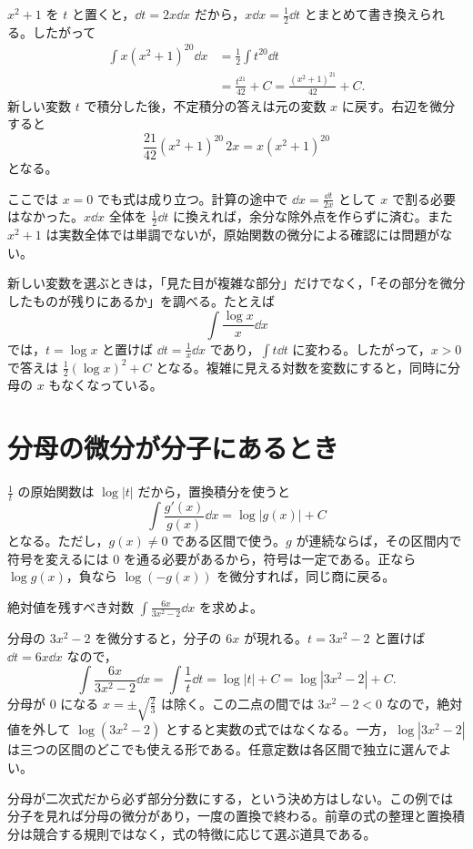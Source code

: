 $x^2+1$ を $t$ と置くと，$\dd t=2x\dd x$ だから，$x\dd x=\frac12\dd t$ とまとめて書き換えられる。したがって
\[
\begin{aligned}
 \int x(x^2+1)^{20}\dd x
 &=\frac12\int t^{20}\dd t\\
 &=\frac{t^{21}}{42}+C
 =\frac{(x^2+1)^{21}}{42}+C.
\end{aligned}
\]
新しい変数 $t$ で積分した後，不定積分の答えは元の変数 $x$ に戻す。右辺を微分すると
\[
 \frac{21}{42}(x^2+1)^{20}\,2x
 =x(x^2+1)^{20}
\]
となる。

ここでは $x=0$ でも式は成り立つ。計算の途中で $\dd x=\frac{\dd t}{2x}$ として $x$ で割る必要はなかった。$x\dd x$ 全体を $\frac12\dd t$ に換えれば，余分な除外点を作らずに済む。また $x^2+1$ は実数全体では単調でないが，原始関数の微分による確認には問題がない。

新しい変数を選ぶときは，「見た目が複雑な部分」だけでなく，「その部分を微分したものが残りにあるか」を調べる。たとえば
\[
 \int\frac{\log x}{x}\dd x
\]
では，$t=\log x$ と置けば $\dd t=\frac1x\dd x$ であり，$\int t\dd t$ に変わる。したがって，$x>0$ で答えは $\frac12(\log x)^2+C$ となる。複雑に見える対数を変数にすると，同時に分母の $x$ もなくなっている。

\section{分母の微分が分子にあるとき}\label{節:対数型の置換}

$\frac1t$ の原始関数は $\log|t|$ だから，置換積分を使うと
\[
 \int\frac{g'(x)}{g(x)}\dd x=\log|g(x)|+C
\]
となる。ただし，$g(x)\ne0$ である区間で使う。$g$ が連続ならば，その区間内で符号を変えるには $0$ を通る必要があるから，符号は一定である。正なら $\log g(x)$，負なら $\log(-g(x))$ を微分すれば，同じ商に戻る。

\begin{example}{絶対値を残すべき対数}
$\int\frac{6x}{3x^2-2}\dd x$ を求めよ。
\end{example}

分母の $3x^2-2$ を微分すると，分子の $6x$ が現れる。$t=3x^2-2$ と置けば $\dd t=6x\dd x$ なので，
\[
 \int\frac{6x}{3x^2-2}\dd x
 =\int\frac1t\dd t
 =\log|t|+C
 =\log|3x^2-2|+C.
\]
分母が $0$ になる $x=\pm\sqrt{\frac23}$ は除く。この二点の間では $3x^2-2<0$ なので，絶対値を外して $\log(3x^2-2)$ とすると実数の式ではなくなる。一方，$\log|3x^2-2|$ は三つの区間のどこでも使える形である。任意定数は各区間で独立に選んでよい。

分母が二次式だから必ず部分分数にする，という決め方はしない。この例では分子を見れば分母の微分があり，一度の置換で終わる。前章の式の整理と置換積分は競合する規則ではなく，式の特徴に応じて選ぶ道具である。

